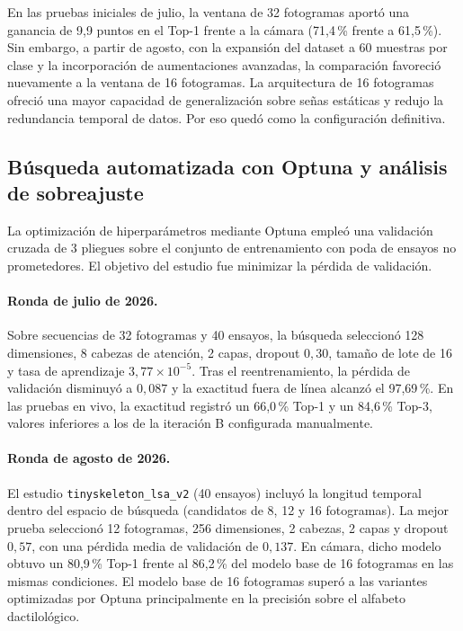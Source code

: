 En las pruebas iniciales de julio, la ventana de 32 fotogramas aportó una ganancia de 9,9 puntos en el Top-1 frente a la cámara (71{,}4\,\% frente a 61{,}5\,\%). Sin embargo, a partir de agosto, con la expansión del dataset a 60 muestras por clase y la incorporación de aumentaciones avanzadas, la comparación favoreció nuevamente a la ventana de 16 fotogramas. La arquitectura de 16 fotogramas ofreció una mayor capacidad de generalización sobre señas estáticas y redujo la redundancia temporal de datos. Por eso quedó como la configuración definitiva.

\subsection{Búsqueda automatizada con Optuna y análisis de sobreajuste}
La optimización de hiperparámetros mediante Optuna empleó una validación cruzada de 3 pliegues sobre el conjunto de entrenamiento con poda de ensayos no prometedores. El objetivo del estudio fue minimizar la pérdida de validación.

\paragraph{Ronda de julio de 2026.}
Sobre secuencias de 32 fotogramas y 40 ensayos, la búsqueda seleccionó 128 dimensiones, 8 cabezas de atención, 2 capas, dropout $0{,}30$, tamaño de lote de 16 y tasa de aprendizaje $3{,}77 \times 10^{-5}$. Tras el reentrenamiento, la pérdida de validación disminuyó a $0{,}087$ y la exactitud fuera de línea alcanzó el 97{,}69\,\%. En las pruebas en vivo, la exactitud registró un 66{,}0\,\% Top-1 y un 84{,}6\,\% Top-3, valores inferiores a los de la iteración B configurada manualmente.

\paragraph{Ronda de agosto de 2026.}
El estudio \texttt{tinyskeleton\_lsa\_v2} (40 ensayos) incluyó la longitud temporal dentro del espacio de búsqueda (candidatos de 8, 12 y 16 fotogramas). La mejor prueba seleccionó 12 fotogramas, 256 dimensiones, 2 cabezas, 2 capas y dropout $0{,}57$, con una pérdida media de validación de $0{,}137$. En cámara, dicho modelo obtuvo un 80{,}9\,\% Top-1 frente al 86{,}2\,\% del modelo base de 16 fotogramas en las mismas condiciones. El modelo base de 16 fotogramas superó a las variantes optimizadas por Optuna principalmente en la precisión sobre el alfabeto dactilológico.

